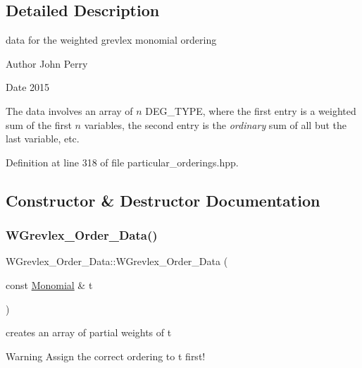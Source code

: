 \subsection{Detailed Description}
data for the weighted grevlex monomial ordering 

\begin{DoxyAuthor}{Author}
John Perry 
\end{DoxyAuthor}
\begin{DoxyDate}{Date}
2015
\end{DoxyDate}
The data involves an array of $n$ {\ttfamily D\+E\+G\+\_\+\+T\+Y\+PE}, where the first entry is a weighted sum of the first $n$ variables, the second entry is the {\itshape ordinary} sum of all but the last variable, etc. 

Definition at line 318 of file particular\+\_\+orderings.\+hpp.



\subsection{Constructor \& Destructor Documentation}
\mbox{\label{class_w_grevlex___order___data_a48076dd5a0a5c89e5b1249f760eac8ac}} 
\subsubsection{\texorpdfstring{W\+Grevlex\+\_\+\+Order\+\_\+\+Data()}{WGrevlex\_Order\_Data()}}
{\footnotesize\ttfamily W\+Grevlex\+\_\+\+Order\+\_\+\+Data\+::\+W\+Grevlex\+\_\+\+Order\+\_\+\+Data (\begin{DoxyParamCaption}\item[{const \hyperlink{class_monomial}{Monomial} \&}]{t }\end{DoxyParamCaption})}



creates an array of partial weights of {\ttfamily t} 

\begin{DoxyWarning}{Warning}
Assign the correct ordering to {\ttfamily t} first! 
\end{DoxyWarning}


